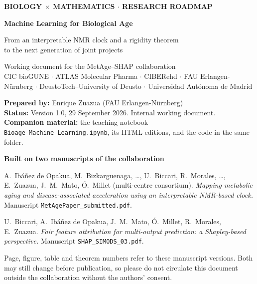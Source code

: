 \documentclass[11pt,a4paper]{article}
\newcommand{\preparedby}{Enrique Zuazua (FAU Erlangen-N\"urnberg)}
\newcommand{\docversion}{Version 1.0}
\newcommand{\docdate}{29 September 2026}
\theoremstyle{plain}
\theoremstyle{definition}
\theoremstyle{remark}
\begin{document}
\begin{titlepage}\sloppy
\begin{tcolorbox}[colback=navy,colframe=navy,arc=4pt,left=18pt,right=18pt,top=18pt,bottom=18pt]
\color{white}
{\small\color{teal!40!white}\bfseries BIOLOGY $\times$ MATHEMATICS $\cdot$ RESEARCH ROADMAP}\par\medskip
{\LARGE\bfseries Machine Learning for Biological Age}\par\smallskip
{\Large From an interpretable NMR clock and a rigidity theorem\\ to the next generation of joint projects}\par\bigskip
{\normalsize Working document for the MetAge--SHAP collaboration\\
CIC bioGUNE $\cdot$ ATLAS Molecular Pharma $\cdot$ CIBERehd $\cdot$ FAU Erlangen-N\"urnberg $\cdot$ DeustoTech--University of Deusto $\cdot$ Universidad Aut\'onoma de Madrid}
\end{tcolorbox}

\vspace{1.2em}
\noindent\textbf{Prepared by:} \preparedby\\
\textbf{Status:} \docversion, \docdate. Internal working document.\\
\textbf{Companion material:} the teaching notebook \texttt{Bioage\_Machine\_Learning.ipynb}, its HTML editions, and the code in the same folder.

\vspace{1.2em}
\noindent\textbf{Built on two manuscripts of the collaboration}
\begin{description}[leftmargin=2.4em,style=nextline]
\item[\PI] A.~Ib\'a\~nez de Opakua, M.~Bizkarguenaga, \dots, U.~Biccari, R.~Morales, \dots, E.~Zuazua, J.~M.~Mato, \'O.~Millet (multi-centre consortium).
\emph{Mapping metabolic aging and disease-associated acceleration using an interpretable NMR-based clock.} Manuscript \texttt{MetAgePaper\_submitted.pdf}.
\item[\PII] U.~Biccari, A.~Ib\'a\~nez de Opakua, J.~M.~Mato, \'O.~Millet, R.~Morales, E.~Zuazua.
\emph{Fair feature attribution for multi-output prediction: a Shapley-based perspective.} Manuscript \texttt{SHAP\_SIMODS\_03.pdf}.
\end{description}
Page, figure, table and theorem numbers refer to these manuscript versions. Both may still change before publication, so please do not circulate this document outside the collaboration without the authors' consent.


\end{titlepage}
\end{document}
